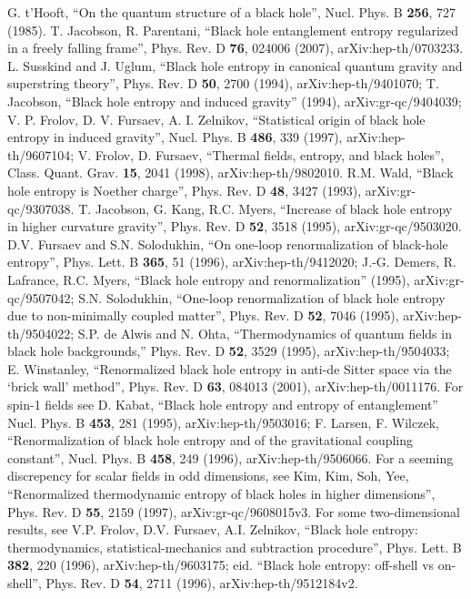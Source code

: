 \documentclass[12pt]{article}
\begin{document}
\begin{thebibliography}{99}
G. t'Hooft, ``On the quantum structure of a black hole'', Nucl. Phys. B \textbf{256}, 727 (1985).
T. Jacobson, R. Parentani, ``Black hole entanglement entropy regularized in a freely falling frame'', Phys. Rev. D \textbf{76}, 024006 (2007), arXiv:hep-th/0703233.
L. Susskind and J. Uglum, ``Black hole entropy in canonical quantum gravity and superstring theory'', Phys. Rev. D \textbf{50}, 2700 (1994), arXiv:hep-th/9401070; T. Jacobson, ``Black hole entropy and induced gravity'' (1994), arXiv:gr-qc/9404039; V. P. Frolov, D. V. Fursaev, A. I. Zelnikov, ``Statistical origin of black hole entropy in induced gravity'', Nucl. Phys. B \textbf{486}, 339 (1997), arXiv:hep-th/9607104; V. Frolov, D. Fursaev, ``Thermal fields, entropy, and black holes'', Class. Quant. Grav. \textbf{15}, 2041 (1998), arXiv:hep-th/9802010.
R.M. Wald, ``Black hole entropy is Noether charge'', Phys. Rev. D \textbf{48}, 3427 (1993), arXiv:gr-qc/9307038.
T. Jacobson, G. Kang, R.C. Myers, ``Increase of black hole entropy in higher curvature gravity'', Phys. Rev. D \textbf{52}, 3518 (1995), arXiv:gr-qc/9503020.
D.V. Fursaev and S.N. Solodukhin, ``On one-loop renormalization of black-hole entropy'', Phys. Lett. B \textbf{365}, 51 (1996), arXiv:hep-th/9412020; J.-G. Demers, R. Lafrance, R.C. Myers, ``Black hole entropy and renormalization'' (1995), arXiv:gr-qc/9507042; S.N. Solodukhin, ``One-loop renormalization of black hole entropy due to non-minimally coupled matter'', Phys. Rev. D \textbf{52}, 7046 (1995), arXiv:hep-th/9504022; S.P. de Alwis and N. Ohta, ``Thermodynamics of quantum fields in black hole backgrounds,'' Phys. Rev. D \textbf{52}, 3529 (1995), arXiv:hep-th/9504033; E. Winstanley, ``Renormalized black hole entropy in anti-de Sitter space via the `brick wall' method'', Phys. Rev. D \textbf{63}, 084013 (2001), arXiv:hep-th/0011176.  For spin-1 fields see D. Kabat, ``Black hole entropy and entropy of entanglement'' Nucl. Phys. B \textbf{453}, 281 (1995), arXiv:hep-th/9503016; F. Larsen, F. Wilczek, ``Renormalization of black hole entropy and of the gravitational coupling constant'', Nucl. Phys. B \textbf{458}, 249 (1996), arXiv:hep-th/9506066.  For a seeming discrepency for scalar fields in odd dimensions, see Kim, Kim, Soh, Yee, ``Renormalized thermodynamic entropy of black holes in higher dimensions'', Phys. Rev. D \textbf{55}, 2159 (1997), arXiv:gr-qc/9608015v3.  For some two-dimensional results, see V.P. Frolov, D.V. Fursaev, A.I. Zelnikov, ``Black hole entropy: thermodynamics, statistical-mechanics and subtraction procedure'', Phys. Lett. B \textbf{382}, 220 (1996), arXiv:hep-th/9603175; eid. ``Black hole entropy: off-shell vs on-shell'', Phys. Rev. D \textbf{54}, 2711 (1996), arXiv:hep-th/9512184v2.  

\end{thebibliography}
\end{document}
